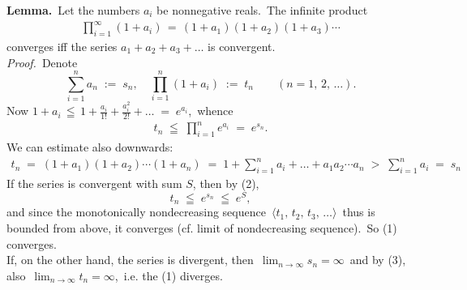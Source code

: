 \documentclass[12pt]{article}
\theoremstyle{definition}
\begin{document}
\textbf{Lemma.}\, Let the numbers $a_i$ be nonnegative reals.\, The infinite product
\begin{align}
\prod_{i=1}^\infty(1\!+\!a_i) \,=\, (1\!+\!a_1)(1\!+\!a_2)(1\!+\!a_3)\cdots
\end{align}
converges iff the series \;$a_1\!+\!a_2\!+\!a_3\!+\ldots$\; is convergent.\\

{\em Proof.}\, Denote
$$\sum_{i=1}^na_n \;:=\; s_n, \quad \prod_{i=1}^n(1\!+\!a_i) \;:=\; t_n \qquad (n = 1,\,2,\,\ldots).$$
Now\; $\displaystyle 1\!+\!a_i \,\leqq\, 1\!+\!\frac{a_i}{1!}\!+\!\frac{a_i^2}{2!}\!+\ldots \;=\; e^{a_i}$,\, whence
\begin{align}
t_n \;\leqq\; \prod_{i=1}^ne^{a_i} \;=\; e^{s_n}.
\end{align}
We can estimate also downwards:
\begin{align}
t_n \;=\; (1\!+\!a_1)(1\!+\!a_2)\cdots(1\!+\!a_n) \;=\; 
1\!+\!\sum_{i=1}^na_i\!+\ldots+\!a_1a_2\cdots a_n \;>\; \sum_{i=1}^na_i \;=\; s_n
\end{align}
If the series is convergent with sum $S$, then by (2),
$$t_n \;\leqq\; e^{s_n} \;\leqq\; e^S,$$
and since the monotonically nondecreasing sequence \,$\langle t_1,\,t_2,\,t_3,\,\ldots\rangle$\, thus is bounded from above, it converges (cf. limit of nondecreasing sequence).\, So (1) converges.\\

If, on the other hand, the series is divergent, then\, $\displaystyle\lim_{n\to\infty}s_n = \infty$\, and by (3), also\, $\displaystyle\lim_{n\to\infty}t_n = \infty$,\, i.e. the  (1) diverges.



 

\end{document}
